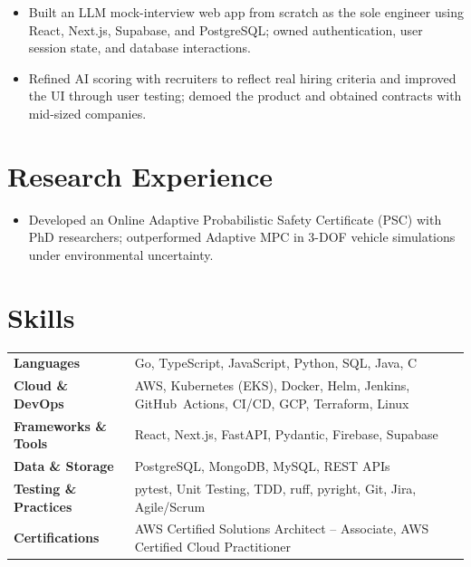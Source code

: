 \documentclass[11pt, letterpaper]{article}
\begin{document}
\begin{itemize}
  \item Built an LLM mock-interview web app from scratch as the sole engineer using React, Next.js, Supabase, and PostgreSQL; owned authentication, user session state, and database interactions.
  \item Refined AI scoring with recruiters to reflect real hiring criteria and improved the UI through user testing; demoed the product and obtained contracts with mid-sized companies.
\end{itemize}

\section{Research Experience}
\begin{itemize}
  \item Developed an Online Adaptive Probabilistic Safety Certificate (PSC) with PhD researchers; outperformed Adaptive MPC in 3-DOF vehicle simulations under environmental uncertainty.
\end{itemize}

\section{Skills}
\begin{tabularx}{\textwidth}{@{}l @{\hspace{7pt}} >{\raggedright\arraybackslash}X@{}}
  \textbf{Languages} & Go, TypeScript, JavaScript, Python, SQL, Java, C \\[1pt]
  \textbf{Cloud \& DevOps} & AWS, Kubernetes (EKS), Docker, Helm, Jenkins, GitHub~Actions, CI/CD, GCP, Terraform, Linux \\[1pt]
  \textbf{Frameworks \& Tools} & React, Next.js, FastAPI, Pydantic, Firebase, Supabase \\[1pt]
  \textbf{Data \& Storage} & PostgreSQL, MongoDB, MySQL, REST APIs \\[1pt]
  \textbf{Testing \& Practices} & pytest, Unit Testing, TDD, ruff, pyright, Git, Jira, Agile/Scrum \\[1pt]
  \textbf{Certifications} & AWS Certified Solutions Architect -- Associate, AWS Certified Cloud Practitioner \\
\end{tabularx}
\end{document}

